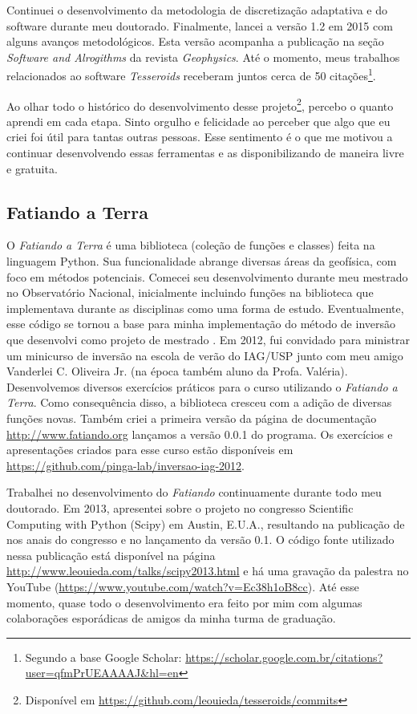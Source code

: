 Continuei o desenvolvimento da metodologia de discretização adaptativa e do
software durante meu doutorado.
Finalmente, lancei a versão 1.2 em 2015 com alguns avanços metodológicos.
Esta versão acompanha a publicação \citet{tesseroids} na seção \textit{Software
and Alrogithms} da revista \textit{Geophysics}.
Até o momento, meus trabalhos relacionados ao software \textit{Tesseroids}
receberam juntos cerca de 50 citações\footnote{Segundo a base Google Scholar:
\url{https://scholar.google.com.br/citations?user=qfmPrUEAAAAJ&hl=en}}.

Ao olhar todo o histórico do desenvolvimento desse
projeto\footnote{Disponível em
\url{https://github.com/leouieda/tesseroids/commits}},
percebo o quanto aprendi em cada etapa.
Sinto orgulho e felicidade ao perceber que algo que eu criei foi útil para
tantas outras pessoas.
Esse sentimento é o que me motivou a continuar desenvolvendo essas ferramentas
e as disponibilizando de maneira livre e gratuita.



\subsection{Fatiando a Terra}


O \textit{Fatiando a Terra} é uma biblioteca (coleção de funções e classes)
feita na linguagem Python.
Sua funcionalidade abrange diversas áreas da geofísica, com foco em métodos
potenciais.
Comecei seu desenvolvimento durante meu mestrado no Observatório Nacional,
inicialmente incluindo funções na biblioteca que implementava durante as
disciplinas como uma forma de estudo.
Eventualmente, esse código se tornou a base para minha implementação do método
de inversão que desenvolvi como projeto de mestrado \citep[][cujo código está
disponível em
\url{https://github.com/pinga-lab/paper-planting-densities}]{seed}.
Em 2012, fui convidado para ministrar um minicurso de inversão na escola de
verão do IAG/USP junto com meu
amigo Vanderlei C. Oliveira Jr. (na época também aluno da Profa.  Valéria).
Desenvolvemos diversos exercícios práticos para o curso utilizando o
\textit{Fatiando a Terra}.
Como consequência disso, a biblioteca cresceu com a adição de diversas funções
novas.
Também criei a primeira versão da página de documentação
\url{http://www.fatiando.org} lançamos a versão 0.0.1 do programa.
Os exercícios e apresentações criados para esse curso estão disponíveis em
\url{https://github.com/pinga-lab/inversao-iag-2012}.

Trabalhei no desenvolvimento do \textit{Fatiando} continuamente durante todo
meu doutorado.
Em 2013, apresentei sobre o projeto no congresso Scientific Computing with
Python (Scipy) em Austin, E.U.A., resultando na publicação de \citet{fatiando}
nos anais do congresso e no lançamento da versão 0.1.
O código fonte utilizado nessa publicação está disponível na página
\url{http://www.leouieda.com/talks/scipy2013.html} e há uma gravação da
palestra no YouTube (\url{https://www.youtube.com/watch?v=Ec38h1oB8cc}).
Até esse momento, quase todo o desenvolvimento era feito por mim com algumas
colaborações esporádicas de amigos da minha turma de graduação.


